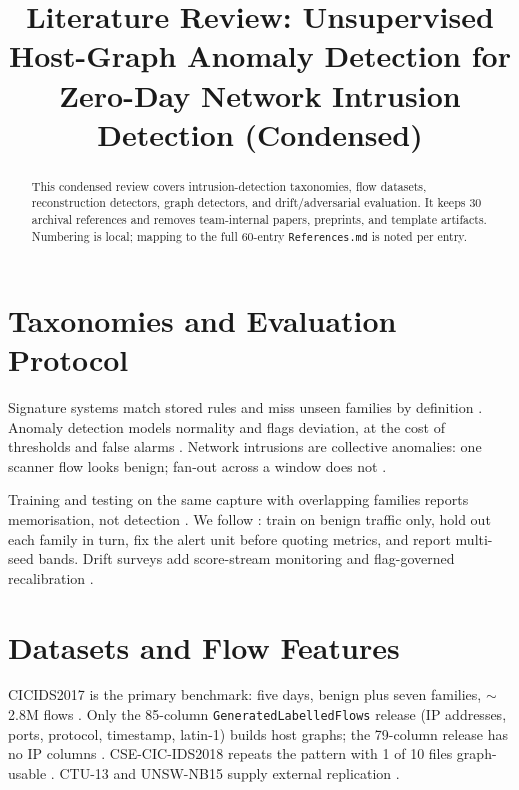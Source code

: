 \documentclass[conference]{IEEEtran}
\begin{document}
\title{Literature Review: Unsupervised Host-Graph Anomaly Detection for Zero-Day Network Intrusion Detection (Condensed)}
\author{
}
\maketitle

\begin{abstract}
This condensed review covers intrusion-detection taxonomies, flow datasets, reconstruction detectors, graph detectors, and drift/adversarial evaluation. It keeps 30 archival references and removes team-internal papers, preprints, and template artifacts. Numbering is local; mapping to the full 60-entry \texttt{References.md} is noted per entry.
\end{abstract}

\section{Taxonomies and Evaluation Protocol}
Signature systems match stored rules and miss unseen families by definition \cite{debar1999,axelsson2000}. Anomaly detection models normality and flags deviation, at the cost of thresholds and false alarms \cite{chandola2009,bhuyan2014}. Network intrusions are collective anomalies: one scanner flow looks benign; fan-out across a window does not \cite{chandola2009}.

Training and testing on the same capture with overlapping families reports memorisation, not detection \cite{sommer2010}. We follow \cite{sommer2010}: train on benign traffic only, hold out each family in turn, fix the alert unit before quoting metrics, and report multi-seed bands. Drift surveys add score-stream monitoring and flag-governed recalibration \cite{gama2014}.

\section{Datasets and Flow Features}
CICIDS2017 is the primary benchmark: five days, benign plus seven families, $\sim$2.8M flows \cite{sharafaldin2018}. Only the 85-column \texttt{GeneratedLabelledFlows} release (IP addresses, ports, protocol, timestamp, latin-1) builds host graphs; the 79-column release has no IP columns \cite{sharafaldin2018}. CSE-CIC-IDS2018 repeats the pattern with 1 of 10 files graph-usable \cite{ids2018}. CTU-13 and UNSW-NB15 supply external replication \cite{garcia2014,moustafa2015}.
\end{document}
